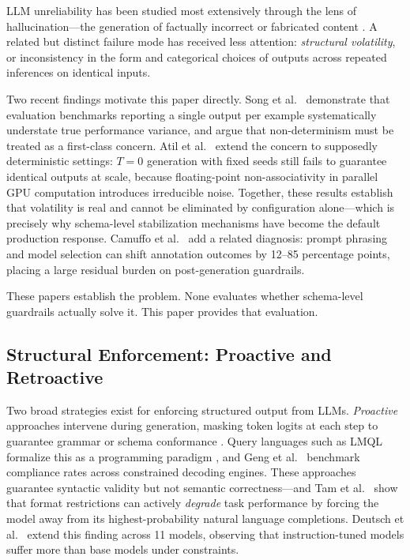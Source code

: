 \documentclass[sigconf]{acmart}
\begin{document}
LLM unreliability has been studied most extensively through the lens of hallucination---the generation of factually incorrect or fabricated content \cite{ji2023survey}. A related but distinct failure mode has received less attention: \emph{structural volatility}, or inconsistency in the form and categorical choices of outputs across repeated inferences on identical inputs.

Two recent findings motivate this paper directly. Song et al.\ \cite{song2024good} demonstrate that evaluation benchmarks reporting a single output per example systematically understate true performance variance, and argue that non-determinism must be treated as a first-class concern. Atil et al.\ \cite{atil2024nondeterminism} extend the concern to supposedly deterministic settings: $T{=}0$ generation with fixed seeds still fails to guarantee identical outputs at scale, because floating-point non-associativity in parallel GPU computation introduces irreducible noise. Together, these results establish that volatility is real and cannot be eliminated by configuration alone---which is precisely why schema-level stabilization mechanisms have become the default production response. Camuffo et al.\ \cite{camuffo2025variance} add a related diagnosis: prompt phrasing and model selection can shift annotation outcomes by 12--85 percentage points, placing a large residual burden on post-generation guardrails.

These papers establish the problem. None evaluates whether schema-level guardrails actually solve it. This paper provides that evaluation.

\subsection{Structural Enforcement: Proactive and Retroactive}

Two broad strategies exist for enforcing structured output from LLMs. \emph{Proactive} approaches intervene during generation, masking token logits at each step to guarantee grammar or schema conformance \cite{willard2023efficient}. Query languages such as LMQL formalize this as a programming paradigm \cite{beurer2023prompting}, and Geng et al.\ \cite{geng2025jsonschemabench} benchmark compliance rates across constrained decoding engines. These approaches guarantee syntactic validity but not semantic correctness---and Tam et al.\ \cite{tam2024let} show that format restrictions can actively \emph{degrade} task performance by forcing the model away from its highest-probability natural language completions. Deutsch et al.\ \cite{deutsch2025constrained} extend this finding across 11 models, observing that instruction-tuned models suffer more than base models under constraints.
\end{document}
